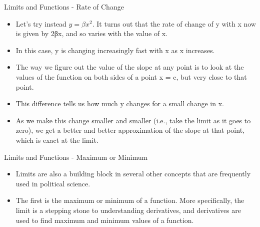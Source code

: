 \documentclass[
  ignorenonframetext,
]{beamer}
\begin{document}
\begin{frame}{Limits and Functions - Rate of Change}
\protect\hypertarget{limits-and-functions---rate-of-change}{}

\begin{itemize}
\item
  Let's try instead \(y = βx^{2}\). It turns out that the rate of change
  of y with x now is given by 2βx, and so varies with the value of x.
\item
  In this case, y is changing increasingly fast with x as x increases.
\item
  The way we figure out the value of the slope at any point is to look
  at the values of the function on both sides of a point x = c, but very
  close to that point.
\item
  This difference tells us how much y changes for a small change in x.
\item
  As we make this change smaller and smaller (i.e., take the limit as it
  goes to zero), we get a better and better approximation of the slope
  at that point, which is exact at the limit.
\end{itemize}

\end{frame}

\begin{frame}{Limits and Functions - Maximum or Minimum}
\protect\hypertarget{limits-and-functions---maximum-or-minimum}{}

\begin{itemize}
\item
  Limits are also a building block in several other concepts that are
  frequently used in political science.
\item
  The first is the maximum or minimum of a function. More specifically,
  the limit is a stepping stone to understanding derivatives, and
  derivatives are used to find maximum and minimum values of a function.
\end{itemize}

\end{frame}
\end{document}
